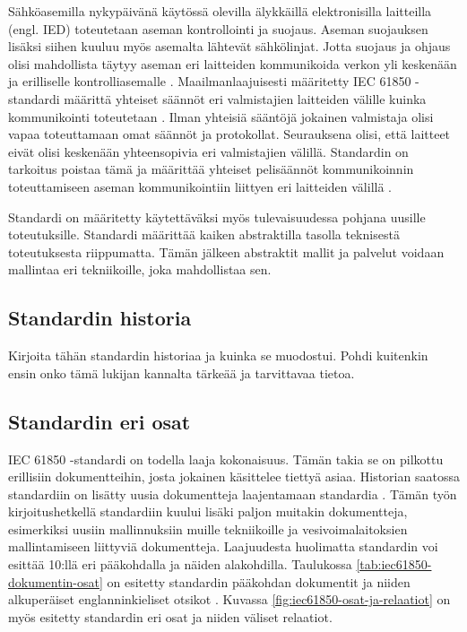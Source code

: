 Sähköasemilla nykypäivänä käytössä olevilla älykkäillä elektronisilla laitteilla (engl. IED) toteutetaan aseman kontrollointi ja suojaus. Aseman suojauksen lisäksi siihen kuuluu myös asemalta lähtevät sähkölinjat. Jotta suojaus ja ohjaus olisi mahdollista täytyy aseman eri laitteiden kommunikoida verkon yli keskenään ja erilliselle kontrolliasemalle \cite[s.~1]{Brunner2008}. Maailmanlaajuisesti määritetty IEC 61850 -standardi määrittä yhteiset säännöt eri valmistajien laitteiden välille kuinka kommunikointi toteutetaan \cite[s.~10]{IEC61850-7-1}. Ilman yhteisiä sääntöjä jokainen valmistaja olisi vapaa toteuttamaan omat säännöt ja protokollat. Seurauksena olisi, että laitteet eivät olisi keskenään yhteensopivia eri valmistajien välillä. Standardin on tarkoitus poistaa tämä ja määrittää yhteiset pelisäännöt kommunikoinnin toteuttamiseen aseman kommunikointiin liittyen eri laitteiden välillä \cite[s.~1]{Kaneda2008} .

Standardi on määritetty käytettäväksi myös tulevaisuudessa pohjana uusille toteutuksille. Standardi määrittää kaiken abstraktilla tasolla teknisestä toteutuksesta riippumatta. Tämän jälkeen abstraktit mallit ja palvelut voidaan mallintaa eri tekniikoille, joka mahdollistaa sen. \cite[s.~2]{Brunner2008}

\subsection{Standardin historia}
\begin{it}
	Kirjoita tähän standardin historiaa ja kuinka se muodostui. Pohdi kuitenkin ensin onko tämä lukijan kannalta tärkeää ja tarvittavaa tietoa.
\end{it}

\subsection{Standardin eri osat}

IEC 61850 -standardi on todella laaja kokonaisuus. Tämän takia se on pilkottu erillisiin dokumentteihin, josta jokainen käsittelee tiettyä asiaa. Historian saatossa standardiin on lisätty uusia dokumentteja laajentamaan standardia \cite{IEC61850series, New-documents-by-IEC-TC-57}. Tämän työn kirjoitushetkellä standardiin kuului lisäki paljon muitakin dokumentteja, esimerkiksi uusiin mallinnuksiin muille tekniikoille ja vesivoimalaitoksien mallintamiseen liittyviä dokumentteja. Laajuudesta huolimatta standardin voi esittää 10:llä eri pääkohdalla ja näiden alakohdilla. Taulukossa \ref{tab:iec61850-dokumentin-osat} on esitetty standardin pääkohdan dokumentit ja niiden alkuperäiset englanninkieliset otsikot \cite[s.~2]{Mackiewicz2006} \cite{IEC61850series}. Kuvassa \ref{fig:iec61850-osat-ja-relaatiot} on myös esitetty standardin eri osat ja niiden väliset relaatiot.

